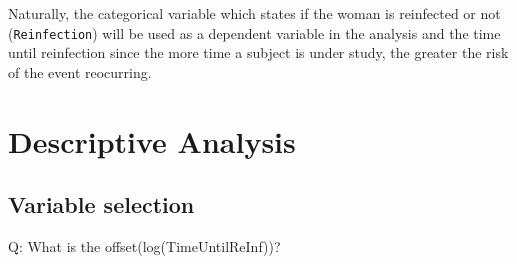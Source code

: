 \documentclass[
]{article}
\begin{document}
Naturally, the categorical variable which states if the woman is reinfected or not (\texttt{Reinfection}) will be used as a dependent variable in the analysis and the time until reinfection since the more time a subject is under study, the greater the risk of the event reocurring.

\hypertarget{descriptive-analysis}{%
\section{Descriptive Analysis}\label{descriptive-analysis}}

\hypertarget{variable-selection}{%
\subsection{Variable selection}\label{variable-selection}}

Q: What is the offset(log(TimeUntilReInf))?
\end{document}
